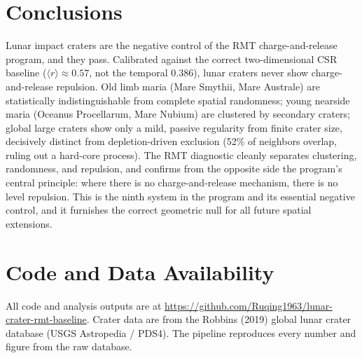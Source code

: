 \documentclass[12pt,a4paper]{article}
\begin{document}
\section{Conclusions}

Lunar impact craters are the negative control of the RMT charge-and-release program, and they pass. Calibrated against the correct two-dimensional CSR baseline ($\langle r\rangle\approx0.57$, not the temporal $0.386$), lunar craters never show charge-and-release repulsion. Old limb maria (Mare Smythii, Mare Australe) are statistically indistinguishable from complete spatial randomness; young nearside maria (Oceanus Procellarum, Mare Nubium) are clustered by secondary craters; global large craters show only a mild, passive regularity from finite crater size, decisively distinct from depletion-driven exclusion (52\% of neighbors overlap, ruling out a hard-core process). The RMT diagnostic cleanly separates clustering, randomness, and repulsion, and confirms from the opposite side the program's central principle: where there is no charge-and-release mechanism, there is no level repulsion. This is the ninth system in the program and its essential negative control, and it furnishes the correct geometric null for all future spatial extensions.

\section*{Code and Data Availability}
All code and analysis outputs are at \url{https://github.com/Ruqing1963/lunar-crater-rmt-baseline}. Crater data are from the Robbins (2019) global lunar crater database (USGS Astropedia / PDS4). The pipeline reproduces every number and figure from the raw database.
\end{document}
